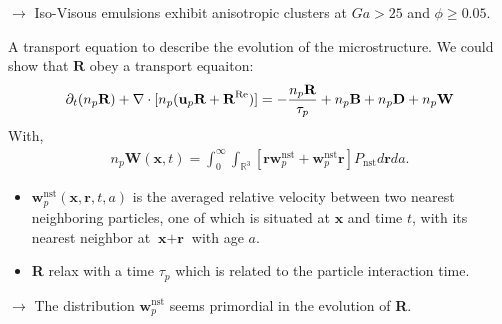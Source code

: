 \documentclass{sintefbeamer}
\begin{document}
\begin{frame}
$\to$ Iso-Visous emulsions exhibit anisotropic clusters at $Ga > 25$ and $\phi \ge 0.05$.  

\end{frame}

\begin{frame}
  {A transport equation to describe the evolution of the microstructure. }
  We could show that $\textbf{R}$ obey a transport equaiton: 
\begin{equation*}
    \partial_t (n_p\textbf{R})
    + \mathbf{\nabla}\cdot [
      n_p(\textbf{u}_p\textbf{R}
    + \textbf{R}^\text{Re})]
    = 
    - \frac{n_p\textbf{R}}{\tau_p}
    +n_p\textbf{B}
    + n_p\textbf{D}
    + n_p\textbf{W}
\end{equation*}
With,
\begin{align*}
    n_p \textbf{W}(\textbf{x},t) = 
    \int_{0}^\infty
    \int_{\mathbb{R}^3} \left[
        \textbf{r} \textbf{w}^\text{nst}_p
        + \textbf{w}^\text{nst}_p\textbf{r}
    \right]P_\text{nst}
    d\textbf{r}
    da.
\end{align*} 

\begin{itemize}
  \item  $\textbf{w}^\text{nst}_p(\textbf{x},\textbf{r},t,a)$ is the averaged relative velocity between two nearest neighboring particles, one of which is situated at $\textbf{x}$ and time $t$, with its nearest neighbor at $\textbf{x}+\textbf{r}$ with age $a$. 
  \item \textbf{R} relax with a time $\tau_p$ which is related to the particle interaction time. 
\end{itemize}

$\to$ The distribution $\textbf{w}^\text{nst}_p$ seems primordial in the evolution of \textbf{R}. 

\end{frame}
\end{document}
